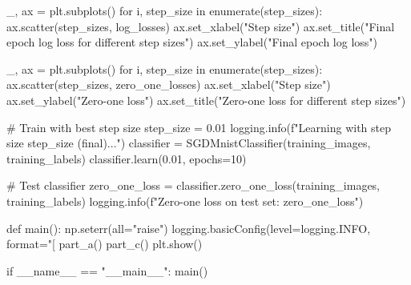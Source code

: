 \documentclass{exam}
\begin{document}
\begin{python}
        _, ax = plt.subplots()
        for i, step_size in enumerate(step_sizes):
            ax.scatter(step_sizes, log_losses)
        ax.set_xlabel("Step size")
        ax.set_title("Final epoch log loss for different step sizes")
        ax.set_ylabel("Final epoch log loss")

        _, ax = plt.subplots()
        for i, step_size in enumerate(step_sizes):
            ax.scatter(step_sizes, zero_one_losses)
        ax.set_xlabel("Step size")
        ax.set_ylabel("Zero-one loss")
        ax.set_title("Zero-one loss for different step sizes")

        # Train with best step size
        step_size = 0.01
        logging.info(f"Learning with step size {step_size} (final)...")
        classifier = SGDMnistClassifier(training_images, training_labels)
        classifier.learn(0.01, epochs=10)

        # Test classifier
        zero_one_loss = classifier.zero_one_loss(training_images, training_labels)
        logging.info(f"Zero-one loss on test set: {zero_one_loss}")


    def main():
        np.seterr(all="raise")
        logging.basicConfig(level=logging.INFO, format="[%
        part_a()
        part_c()
        plt.show()


    if __name__ == "__main__":
        main()
\end{python}
\end{document}
